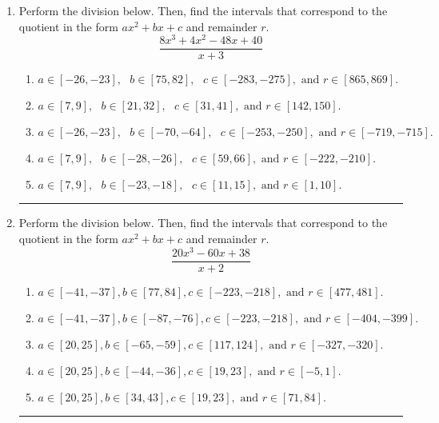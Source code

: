 \documentclass[14pt]{extbook}
\newcommand{\litem}[1]{\item#1\hspace*{-1cm}\rule{\textwidth}{0.4pt}}
\begin{document}
\begin{enumerate}
{\begin{enumerate}[label=\Alph*.]
\end{enumerate} }
\litem{
Perform the division below. Then, find the intervals that correspond to the quotient in the form $ax^2+bx+c$ and remainder $r$.\[ \frac{8x^{3} +4 x^{2} -48 x + 40}{x + 3} \]\begin{enumerate}[label=\Alph*.]
\item \( a \in [-26, -23], \text{   } b \in [75, 82], \text{   } c \in [-283, -275], \text{   and   } r \in [865, 869]. \)
\item \( a \in [7, 9], \text{   } b \in [21, 32], \text{   } c \in [31, 41], \text{   and   } r \in [142, 150]. \)
\item \( a \in [-26, -23], \text{   } b \in [-70, -64], \text{   } c \in [-253, -250], \text{   and   } r \in [-719, -715]. \)
\item \( a \in [7, 9], \text{   } b \in [-28, -26], \text{   } c \in [59, 66], \text{   and   } r \in [-222, -210]. \)
\item \( a \in [7, 9], \text{   } b \in [-23, -18], \text{   } c \in [11, 15], \text{   and   } r \in [1, 10]. \)

\end{enumerate} }
\litem{
Perform the division below. Then, find the intervals that correspond to the quotient in the form $ax^2+bx+c$ and remainder $r$.\[ \frac{20x^{3} -60 x + 38}{x + 2} \]\begin{enumerate}[label=\Alph*.]
\item \( a \in [-41, -37], b \in [77, 84], c \in [-223, -218], \text{ and } r \in [477, 481]. \)
\item \( a \in [-41, -37], b \in [-87, -76], c \in [-223, -218], \text{ and } r \in [-404, -399]. \)
\item \( a \in [20, 25], b \in [-65, -59], c \in [117, 124], \text{ and } r \in [-327, -320]. \)
\item \( a \in [20, 25], b \in [-44, -36], c \in [19, 23], \text{ and } r \in [-5, 1]. \)
\item \( a \in [20, 25], b \in [34, 43], c \in [19, 23], \text{ and } r \in [71, 84]. \)


\end{enumerate}}
\end{enumerate}
\end{document}
